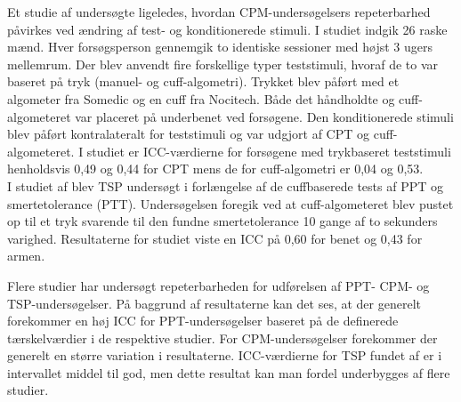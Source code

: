 Et studie af  undersøgte ligeledes, hvordan CPM-undersøgelsers repeterbarhed påvirkes ved ændring af test- og konditionerede stimuli. I studiet indgik 26 raske mænd. Hver forsøgsperson gennemgik to identiske sessioner med højst 3 ugers mellemrum. Der blev anvendt fire forskellige typer teststimuli, hvoraf de to var baseret på tryk (manuel- og cuff-algometri). Trykket blev påført med et algometer fra Somedic og en cuff fra Nocitech. Både det håndholdte og cuff-algometeret var placeret på underbenet ved forsøgene. Den konditionerede stimuli blev påført kontralateralt for teststimuli og var udgjort af CPT og cuff-algometeret. I studiet er ICC-værdierne for forsøgene med trykbaseret teststimuli henholdsvis 0,49 og 0,44 for CPT mens de for cuff-algometri er 0,04 og 0,53.\\ 
I studiet af  blev TSP undersøgt i forlængelse af de cuffbaserede tests af PPT og smertetolerance (PTT). Undersøgelsen foregik ved at cuff-algometeret blev pustet op til et tryk svarende til den fundne smertetolerance 10 gange af to sekunders varighed. Resultaterne for studiet viste en ICC på 0,60 for benet og 0,43 for armen.  

Flere studier har undersøgt repeterbarheden for udførelsen af PPT- CPM- og TSP-undersøgelser. På baggrund af resultaterne kan det ses, at der generelt forekommer en høj ICC for PPT-undersøgelser baseret på de definerede tærskelværdier i de respektive studier. For CPM-undersøgelser forekommer der generelt en større variation i resultaterne. ICC-værdierne for TSP fundet af  er i intervallet middel til god, men dette resultat kan man fordel underbygges af flere studier. 

